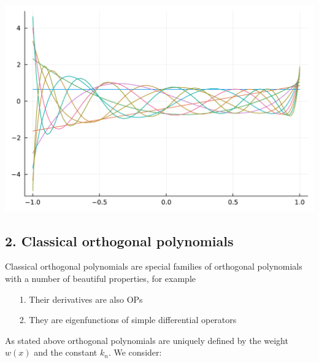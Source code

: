 \documentclass[12pt,a4paper]{article}
\begin{document}
\includegraphics[width=\linewidth]{jl_hpkPoK/OP_methods_test_9_1.pdf}

\subsection{2. Classical orthogonal polynomials}
Classical orthogonal polynomials are special families of orthogonal polynomials with a number of beautiful properties, for example

\begin{itemize}
\item[1. ] Their derivatives are also OPs


\item[2. ] They are eigenfunctions of simple differential operators

\end{itemize}
As stated above orthogonal polynomials are uniquely defined by the weight $w(x)$ and the constant $k_n$. We consider:
\end{document}
